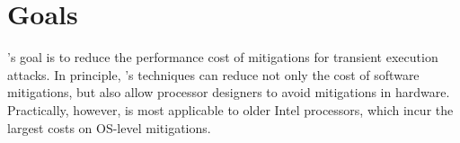 \section{Goals}






\sys's goal is to reduce the performance cost of mitigations for transient
execution attacks.  In principle, \sys's techniques can reduce not only
the cost of software mitigations, but also allow processor designers
to avoid mitigations in hardware.  Practically, however, \sys 
is most applicable to older Intel processors, which incur the largest
costs on OS-level mitigations.


